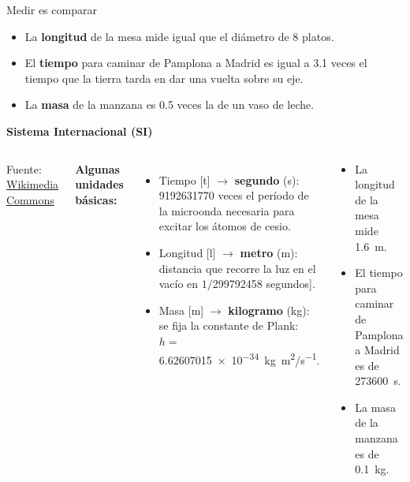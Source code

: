\documentclass[9pt, aspectratio=169]{beamer}
\begin{document}
\begin{frame}{Medir es comparar}
\begin{example}[Mediciones]
\begin{itemize}
 \item La {\bf longitud} de la mesa mide igual que el diámetro de 8 platos. 
 \item El {\bf tiempo} para caminar de Pamplona a Madrid es igual a 3.1 veces el tiempo que la tierra tarda en dar una vuelta sobre su eje.
 \item La {\bf masa} de la manzana es 0.5 veces la de un vaso de leche.
\end{itemize}
\end{example}
\pause

\vspace{0.3cm}
{\bf Sistema Internacional (SI)}
\begin{columns}[c]
\begin{center}


{\tiny Fuente: \href{https://es.wikipedia.org/wiki/Archivo:SI_Logo_with_defining_constants.png}{Wikimedia Commons}}
\end{center}

 {
\textbf{Algunas unidades básicas:}
\begin{itemize}
    \item Tiempo [t] $\rightarrow$ {\bf segundo} (s): \num{9192631770} veces el período de la microonda necesaria para excitar los átomos de cesio.
    \item Longitud [l] $\rightarrow$ {\bf metro} (m): distancia que recorre la luz en el vacío en $1/$\num{299792458} segundos].
    \item Masa [m] $\rightarrow$ {\bf kilogramo} (kg): se fija la constante de Plank: $h=$ \qty{6.62607015e-34}{kg.m^2/s^{-1}}.
\end{itemize}
}
 {
\begin{example}[Mediciones SI]
\begin{itemize}
    \item La longitud de la mesa mide \qty{1.6}{m}. 
    \item El tiempo para caminar de Pamplona a Madrid es de \qty{273600}{s}.
    \item La masa de la manzana es de \qty{0.1}{kg}.
\end{itemize}
\end{example}
}
\end{columns}
\end{frame}
\end{document}
